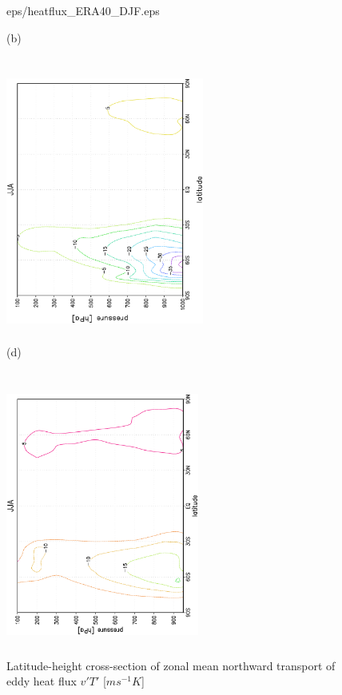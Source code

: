 \documentclass[12pt,a4paper,twoside,openright,headinclude,liststotoc,bibtotoc]{scrreprt}
\begin{document}
\begin{figure}[b]
{{eps/heatflux_ERA40_DJF.eps}
}
\parbox{8.5cm}{\hspace{1cm}\begin{scriptsize}(b)\end{scriptsize} \vspace{-0.5cm} \\
\includegraphics[height=8.5cm,width=6.5cm,angle=-90]
{eps/tmJJAheatflux.eps}
}
\parbox{8.5cm}{\hspace{0.90cm}\begin{scriptsize}(d)\end{scriptsize} \vspace{-0.55cm} \\
\includegraphics[height=8.5cm,width=6.35cm,angle=-90]
{eps/heatflux_ERA40_JJA.eps}
}
\caption[Eddy heat flux for DJF and JJA]{Latitude-height cross-section of zonal mean northward transport of eddy heat flux $v'T'$ [$ms^{-1}K$]}
\label{img:eddyheat}
\end{figure}
\end{document}
